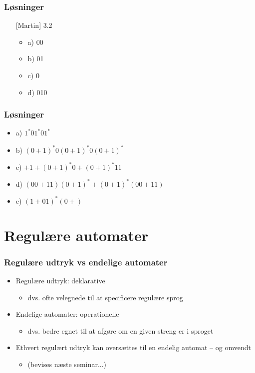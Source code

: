 \documentclass[]{beamer}
\begin{document}
\begin{frame}
\frametitle{Løsninger}
\begin{itemize}[<+->]
\item [] [Martin] 3.2
\begin{itemize}
\item a) 00 
\item b) 01 
\item c) 0 
\item d) 010
\end{itemize}
\end{itemize}
\end{frame}

\begin{frame}
\frametitle{Løsninger}
\begin{itemize}
\item a) $1^*01^*01^*$
\item b) $(0+1)^*0(0+1)^*0(0+1)^*$
\item c) $+ 1 + (0+1)^*0 + (0+1)^*11$
\item d) $(00 + 11)(0+1)^* + (0+1)^*(00 + 11)$
\item e) $(1 + 01)^*(0 + )$ 

\end{itemize}
\end{frame}
\section{Regulære automater}

\begin{frame}
\frametitle{Regulære udtryk vs endelige automater}
\begin{itemize}
\item  Regulære udtryk: deklarative
\begin{itemize}
\item dvs. ofte velegnede til at specificere regulære sprog
\end{itemize}
\item Endelige automater: operationelle
\begin{itemize}
\item dvs. bedre egnet til at afgøre om en given streng er i sproget
\end{itemize}
\item Ethvert regulært udtryk kan oversættes til en
endelig automat – og omvendt
\begin{itemize}
\item (bevises næste seminar...)
\end{itemize}
\end{itemize}
\end{frame}
\end{document}
